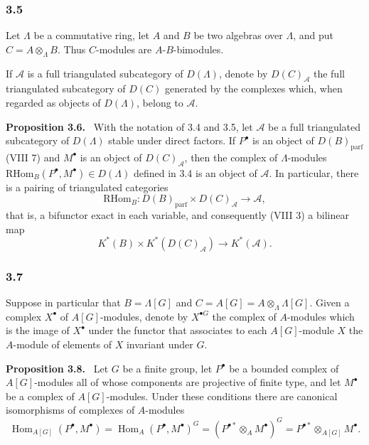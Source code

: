 \documentclass[11pt]{article}
\newenvironment{statement}[1]{\par\medskip\noindent\textbf{#1.}\ }{\par\medskip}
\DeclareMathOperator{\Hom}{Hom}
\providecommand{\RHom}{\mathrm{RHom}}
\providecommand{\parf}{\mathrm{parf}}
\providecommand{\RHom}{\mathrm{RHom}}
\providecommand{\Hom}{\operatorname{Hom}}
\providecommand{\RHom}{\mathrm R\mathcal{H}om}
\providecommand{\parf}{\mathrm{parf}}
\providecommand{\RHom}{\mathrm{RHom}}
\providecommand{\Hom}{\operatorname{Hom}}
\begin{document}
\subsubsection*{3.5}

Let $\Lambda$ be a commutative ring, let $A$ and $B$ be two algebras over $\Lambda$, and put $C=A\otimes_\Lambda B$. Thus $C$-modules are $A$-$B$-bimodules.

If $\mathcal A$ is a full triangulated subcategory of $D(\Lambda)$, denote by $D(C)_{\mathcal A}$ the full triangulated subcategory of $D(C)$ generated by the complexes which, when regarded as objects of $D(\Lambda)$, belong to $\mathcal A$.

\begin{statement}{Proposition 3.6}
With the notation of 3.4 and 3.5, let $\mathcal A$ be a full triangulated subcategory of $D(\Lambda)$ stable under direct factors. If $P^\bullet$ is an object of $D(B)_{\parf}$ (VIII 7) and $M^\bullet$ is an object of $D(C)_{\mathcal A}$, then the complex of $\Lambda$-modules $\RHom_B(P^\bullet,M^\bullet)\in D(\Lambda)$ defined in 3.4 is an object of $\mathcal A$. In particular, there is a pairing of triangulated categories
\[
\RHom_B:D(B)_{\parf}\times D(C)_{\mathcal A}\longrightarrow \mathcal A,
\tag{3.6.1}
\]
that is, a bifunctor exact in each variable, and consequently (VIII 3) a bilinear map
\[
K^*(B)\times K^*(D(C)_{\mathcal A})\longrightarrow K^*(\mathcal A).
\tag{3.6.2}
\]
\end{statement}

\subsubsection*{3.7}

Suppose in particular that $B=\Lambda[G]$ and $C=A[G]=A\otimes_\Lambda\Lambda[G]$. Given a complex $X^\bullet$ of $A[G]$-modules, denote by $X^{\bullet G}$ the complex of $A$-modules which is the image of $X^\bullet$ under the functor that associates to each $A[G]$-module $X$ the $A$-module of elements of $X$ invariant under $G$.

\begin{statement}{Proposition 3.8}
Let $G$ be a finite group, let $P^\bullet$ be a bounded complex of $A[G]$-modules all of whose components are projective of finite type, and let $M^\bullet$ be a complex of $A[G]$-modules. Under these conditions there are canonical isomorphisms of complexes of $A$-modules
\[
\Hom_{A[G]}(P^\bullet,M^\bullet)=\Hom_A(P^\bullet,M^\bullet)^G=(P^{\bullet *}\otimes_A M^\bullet)^G=P^{\bullet *}\otimes_{A[G]}M^\bullet.
\tag{3.8.1}
\]
\end{statement}
\end{document}
